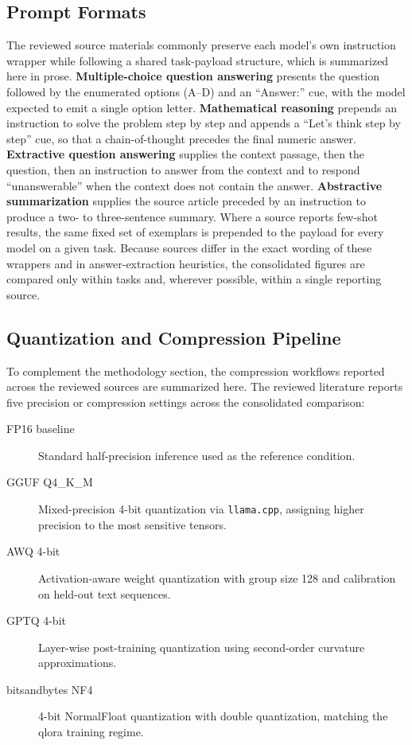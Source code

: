 \subsection{Prompt Formats}
\label{subsec:appendix_prompt_templates}
The reviewed source materials commonly preserve each model's own instruction
wrapper while following a shared task-payload structure, which is summarized here
in prose. \textbf{Multiple-choice question answering} presents the question
followed by the enumerated options (A--D) and an ``Answer:'' cue, with the model
expected to emit a single option letter. \textbf{Mathematical reasoning} prepends
an instruction to solve the problem step by step and appends a ``Let's think step
by step'' cue, so that a chain-of-thought precedes the final numeric answer.
\textbf{Extractive question answering} supplies the context passage, then the
question, then an instruction to answer from the context and to respond
``unanswerable'' when the context does not contain the answer. \textbf{Abstractive
summarization} supplies the source article preceded by an instruction to produce a
two- to three-sentence summary. Where a source reports few-shot results, the same
fixed set of exemplars is prepended to the payload for every model on a given
task. Because sources differ in the exact wording of these wrappers and in
answer-extraction heuristics, the consolidated figures are compared only within
tasks and, wherever possible, within a single reporting source.

\subsection{Quantization and Compression Pipeline}
\label{subsec:appendix_quantization_pipeline}
To complement the methodology section, the compression workflows reported across the reviewed sources are summarized here. The reviewed literature reports five precision or compression settings across the consolidated comparison:
\begin{description}
    \item[FP16 baseline] Standard half-precision inference used as the reference condition.
    \item[GGUF Q4\_K\_M] Mixed-precision 4-bit quantization via \texttt{llama.cpp}, assigning higher precision to the most sensitive tensors.
    \item[AWQ 4-bit] Activation-aware weight quantization with group size 128 and calibration on held-out text sequences.
    \item[GPTQ 4-bit] Layer-wise post-training quantization using second-order curvature approximations.
    \item[bitsandbytes NF4] 4-bit NormalFloat quantization with double quantization, matching the \gls{qlora} training regime.
\end{description}

